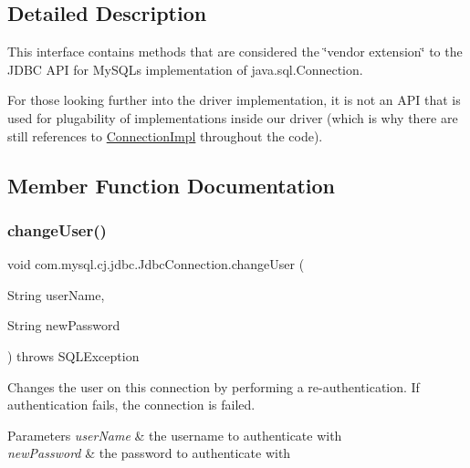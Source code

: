 \subsection{Detailed Description}
This interface contains methods that are considered the \char`\"{}vendor extension\char`\"{} to the J\+D\+BC A\+PI for My\+S\+QL\textquotesingle{}s implementation of java.\+sql.\+Connection.

For those looking further into the driver implementation, it is not an A\+PI that is used for plugability of implementations inside our driver (which is why there are still references to \mbox{\hyperlink{classcom_1_1mysql_1_1cj_1_1jdbc_1_1_connection_impl}{Connection\+Impl}} throughout the code). 

\subsection{Member Function Documentation}
\mbox{\label{interfacecom_1_1mysql_1_1cj_1_1jdbc_1_1_jdbc_connection_aed0496e0f2c1236f2784f92b45a482ef}} 
\subsubsection{\texorpdfstring{change\+User()}{changeUser()}}
{\footnotesize\ttfamily void com.\+mysql.\+cj.\+jdbc.\+Jdbc\+Connection.\+change\+User (\begin{DoxyParamCaption}\item[{String}]{user\+Name,  }\item[{String}]{new\+Password }\end{DoxyParamCaption}) throws S\+Q\+L\+Exception}

Changes the user on this connection by performing a re-\/authentication. If authentication fails, the connection is failed.


\begin{DoxyParams}{Parameters}
{\em user\+Name} & the username to authenticate with \\
\hline
{\em new\+Password} & the password to authenticate with \\
\hline
\end{DoxyParams}

